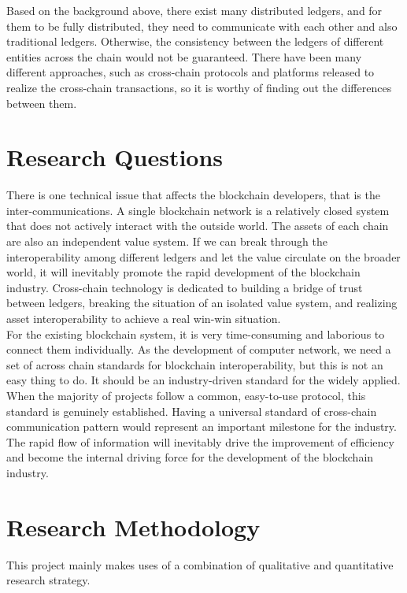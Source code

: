 \noindent Based on the background above, there exist many distributed ledgers, and for them to be fully distributed, they need to communicate with each other and also traditional ledgers. Otherwise, the consistency between the ledgers of different entities across the chain would not be guaranteed. There have been many different approaches, such as cross-chain protocols and platforms released to realize the cross-chain transactions, so it is worthy of finding out the differences between them.

\section{Research Questions}
\label{sec:r}
\noindent There is one technical issue that affects the blockchain developers, that is the inter-communications. A single blockchain network is a relatively closed system that does not actively interact with the outside world. The assets of each chain are also an independent value system. If we can break through the interoperability among different ledgers and let the value circulate on the broader world, it will inevitably promote the rapid development of the blockchain industry. Cross-chain technology is dedicated to building a bridge of trust between ledgers, breaking the situation of an isolated value system, and realizing asset interoperability to achieve a real win-win situation.\\

\noindent For the existing blockchain system, it is very time-consuming and laborious to connect them individually. As the development of computer network, we need a set of across chain standards for blockchain interoperability, but this is not an easy thing to do. It should be an industry-driven standard for the widely applied. When the majority of projects follow a common, easy-to-use protocol, this standard is genuinely established. Having a universal standard of cross-chain communication pattern would represent an important milestone for the industry. The rapid flow of information will inevitably drive the improvement of efficiency and become the internal driving force for the development of the blockchain industry.


\section{Research Methodology}
\label{sec:rm}
\noindent This project mainly makes uses of a combination of qualitative and quantitative research strategy.\\

